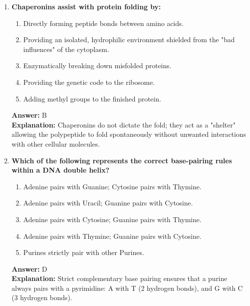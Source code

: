 \documentclass[11pt, a4paper]{article}
\begin{document}
\begin{enumerate}
\item \textbf{Chaperonins assist with protein folding by:}
\begin{enumerate}[label=\Alph*.]
    \item Directly forming peptide bonds between amino acids.
    \item Providing an isolated, hydrophilic environment shielded from the "bad influences" of the cytoplasm.
    \item Enzymatically breaking down misfolded proteins.
    \item Providing the genetic code to the ribosome.
    \item Adding methyl groups to the finished protein.
\end{enumerate}
\textbf{Answer:} B \\
\textbf{Explanation:} Chaperonins do not dictate the fold; they act as a "shelter" allowing the polypeptide to fold spontaneously without unwanted interactions with other cellular molecules.

\item \textbf{Which of the following represents the correct base-pairing rules within a DNA double helix?}
\begin{enumerate}[label=\Alph*.]
    \item Adenine pairs with Guanine; Cytosine pairs with Thymine.
    \item Adenine pairs with Uracil; Guanine pairs with Cytosine.
    \item Adenine pairs with Cytosine; Guanine pairs with Thymine.
    \item Adenine pairs with Thymine; Guanine pairs with Cytosine.
    \item Purines strictly pair with other Purines.
\end{enumerate}
\textbf{Answer:} D \\
\textbf{Explanation:} Strict complementary base pairing ensures that a purine always pairs with a pyrimidine: A with T (2 hydrogen bonds), and G with C (3 hydrogen bonds).

\end{enumerate}
\end{document}
